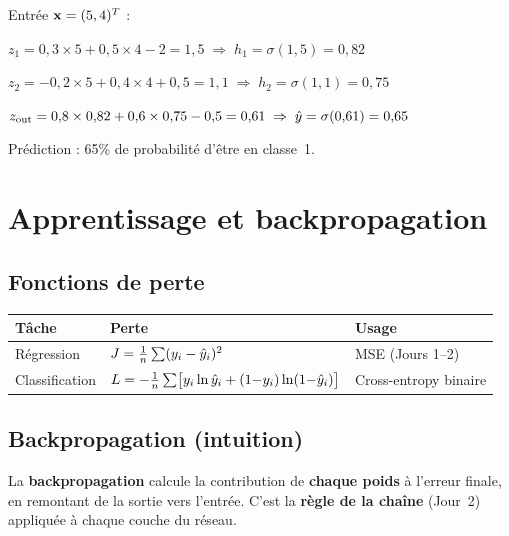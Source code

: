 \begin{exemplebox}
    Entr\'{e}e $\mathbf{x} = (5, 4)^T$ :

    \smallskip
    $z_1 = 0{,}3 \times 5 + 0{,}5 \times 4 - 2 = 1{,}5 \;\Rightarrow\; h_1 = \sigma(1{,}5) = 0{,}82$

    $z_2 = {-}0{,}2 \times 5 + 0{,}4 \times 4 + 0{,}5 = 1{,}1 \;\Rightarrow\; h_2 = \sigma(1{,}1) = 0{,}75$

    $z_{\text{out}} = 0{,}8 \times 0{,}82 + 0{,}6 \times 0{,}75 - 0{,}5 = 0{,}61 \;\Rightarrow\; \hat{y} = \sigma(0{,}61) = 0{,}65$

    \smallskip
    Pr\'{e}diction : 65\% de probabilit\'{e} d'\^{e}tre en classe~1.
\end{exemplebox}

\section{Apprentissage et backpropagation}

\subsection{Fonctions de perte}

\begin{center}
\renewcommand{\arraystretch}{1.35}
\begin{tabularx}{\textwidth}{l >{\centering\arraybackslash}p{5.5cm} X}
    \toprule
    \textbf{T\^{a}che} & \textbf{Perte} & \textbf{Usage} \\
    \midrule
    R\'{e}gression
        & $J = \frac{1}{n}\sum(y_i - \hat{y}_i)^2$
        & MSE (Jours 1--2) \\
    Classification
        & $L = -\frac{1}{n}\sum\bigl[y_i\ln\hat{y}_i + (1{-}y_i)\ln(1{-}\hat{y}_i)\bigr]$
        & Cross-entropy binaire \\
    \bottomrule
\end{tabularx}
\end{center}

\subsection{Backpropagation (intuition)}

\begin{intuitionbox}
    La \textbf{backpropagation} calcule la contribution de \textbf{chaque poids} \`{a} l'erreur
    finale, en remontant de la sortie vers l'entr\'{e}e. C'est la \textbf{r\`{e}gle de la cha\^{i}ne}
    (Jour~2) appliqu\'{e}e \`{a} chaque couche du r\'{e}seau.
\end{intuitionbox}

